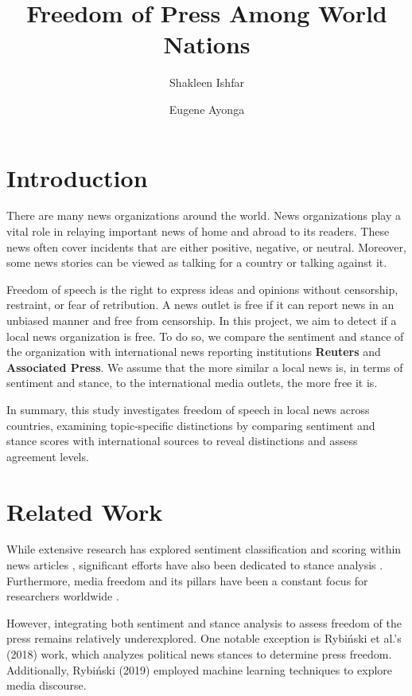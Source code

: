\documentclass{article}
\title{Freedom of Press Among World Nations}
\author{Shakleen Ishfar \and Eugene Ayonga}
\theoremstyle{mytheoremstyle}
\theoremstyle{mytheoremstyle}
\theoremstyle{myproblemstyle}
\begin{document}
    \maketitle

    \section{Introduction}

    There are many news organizations around the world. News organizations play a vital role in relaying important news of home and abroad to its readers. These news often cover incidents that are either positive, negative, or neutral. Moreover, some news stories can be viewed as talking for a country or talking against it. 

    Freedom of speech is the right to express ideas and opinions without censorship, restraint, or fear of retribution. A news outlet is free if it can report news in an unbiased manner and free from censorship. In this project, we aim to detect if a local news organization is free. To do so, we compare the sentiment and stance of the organization with international news reporting institutions \textbf{Reuters} and \textbf{Associated Press}. We assume that the more similar a local news is, in terms of sentiment and stance, to the international media outlets, the more free it is. 
    
    In summary, this study investigates freedom of speech in local news across countries, examining topic-specific distinctions by comparing sentiment and stance scores with international sources to reveal distinctions and assess agreement levels.

    \section{Related Work}

    While extensive research has explored sentiment classification and scoring within news articles \cite{godbole2007large, bautin2008international}, significant efforts have also been dedicated to stance analysis \cite{haddington2004stance, hanselowski2018retrospective}. Furthermore, media freedom and its pillars have been a constant focus for researchers worldwide \cite{balvcytiene2021crisis, oster2015media, meyen2016crime}.

    However, integrating both sentiment and stance analysis to assess freedom of the press remains relatively underexplored. One notable exception is Rybiński et al.'s (2018) work, which analyzes political news stances to determine press freedom. \cite{rybinski2018political} Additionally, Rybiński (2019) employed machine learning techniques to explore media discourse. \cite{rybinski2019machine}
\end{document}
